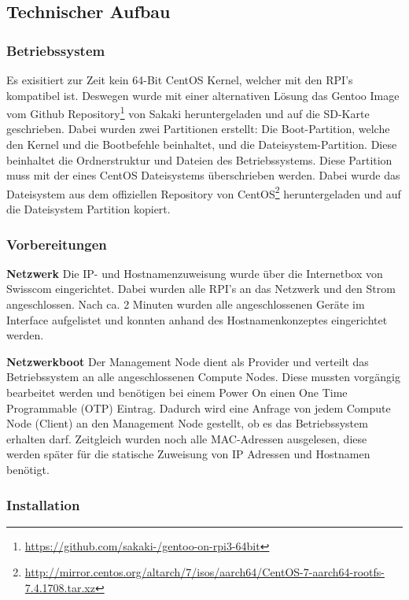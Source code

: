 \subsection{Technischer Aufbau}
\subsubsection{Betriebssystem}
Es exisitiert zur Zeit kein 64-Bit CentOS Kernel, welcher mit den RPI's kompatibel ist. Deswegen wurde mit einer alternativen Lösung das Gentoo Image vom Github Repository\footnote{\url{https://github.com/sakaki-/gentoo-on-rpi3-64bit}} von Sakaki heruntergeladen und auf die SD-Karte geschrieben. Dabei wurden zwei Partitionen erstellt: Die Boot-Partition, welche den Kernel und die Bootbefehle beinhaltet, und die Dateisystem-Partition. Diese beinhaltet die Ordnerstruktur und Dateien des Betriebssystems. Diese Partition muss mit der eines CentOS Dateisystems überschrieben werden. Dabei wurde das Dateisystem aus dem offiziellen Repository von CentOS\footnote{\url{http://mirror.centos.org/altarch/7/isos/aarch64/CentOS-7-aarch64-rootfs-7.4.1708.tar.xz}} heruntergeladen und auf die Dateisystem Partition kopiert.

\subsubsection{Vorbereitungen}
\textbf{Netzwerk}\newline
Die IP- und Hostnamenzuweisung wurde über die Internetbox von Swisscom eingerichtet. Dabei wurden alle RPI's an das Netzwerk und den Strom angeschlossen. Nach ca. 2 Minuten wurden alle angeschlossenen Geräte im Interface aufgelistet und konnten anhand des Hostnamenkonzeptes eingerichtet werden.

\textbf{Netzwerkboot}\newline
Der Management Node dient als Provider und verteilt das Betriebssystem an alle angeschlossenen Compute Nodes. Diese mussten vorgängig bearbeitet werden und benötigen bei einem Power On einen One Time Programmable (OTP) Eintrag. Dadurch wird eine Anfrage von jedem Compute Node (Client) an den Management Node gestellt, ob es das Betriebssystem erhalten darf. Zeitgleich wurden noch alle MAC-Adressen ausgelesen, diese werden später für die statische Zuweisung von IP Adressen und Hostnamen benötigt.

\subsubsection{Installation}

